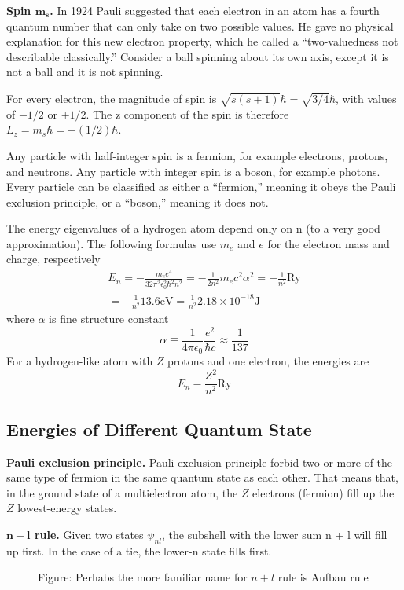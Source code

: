 \documentclass[../../../main.tex]{subfiles}
\begin{document}
\textbf{Spin $\boldsymbol{m_s}$.} In 1924 Pauli suggested that each electron in an atom has a fourth quantum number that can only take on two possible values. He gave no physical explanation for this new electron property, which he called a “two-valuedness not describable classically.” Consider a ball spinning about its own axis, except it is not a ball and it is not spinning.

For every electron, the magnitude of spin is $\sqrt{s(s + 1)}\hbar=\sqrt{3/4}\hbar$, with values of $-1/2$ or $+1/2$. The z component of the spin is therefore $L_z= m_s\hbar=\pm(1/2)\hbar$.

Any particle with half-integer spin is a fermion, for example electrons, protons, and neutrons. Any particle with integer spin is a boson, for example photons. Every particle can be classified as either a “fermion,” meaning it obeys the Pauli exclusion principle, or a “boson,” meaning it does not. 

The energy eigenvalues of a hydrogen atom depend only on n (to a very good approximation). The  following formulas use $m_e$ and $e$ for the electron mass and charge, respectively
\begin{multline*}
    E_n=-\frac{m_ee^4}{32\pi^2\epsilon_0^2
    \hbar^2n^2}=-\frac{1}{2n^2}m_ec^2\alpha^2 = -\frac{1}{n^2}\text{Ry}\\
    = -\frac{1}{n^2}13.6 \text{eV}=\frac{1}{n^2}2.18\times 10^{-18}\text{J}
\end{multline*}
where $\alpha$ is fine structure constant
\begin{equation*}
    \alpha \equiv \frac{1}{4\pi\epsilon_0}\frac{e^2}{\hbar c}\approx \frac{1}{137}
\end{equation*}
For a hydrogen-like atom with $Z$ protons and one electron, the energies are
\begin{equation*}
    E_n-\frac{Z^2}{n^2}\text{Ry}
\end{equation*}

\subsection{Energies of Different Quantum State}
\textbf{Pauli exclusion principle.} Pauli exclusion principle forbid two or more of the same type of fermion in the same quantum state as each other. That means that, in the ground state of a multielectron atom, the $Z$ electrons (fermion) fill up the $Z$ lowest-energy states.

\textbf{$\boldsymbol{n + l}$ rule.} Given two states $\psi_{nl}$, the subshell with the lower sum n + l will fill up first. In the case of a tie, the lower-n state fills first.
\begin{figure}
    \centering
    \caption*{Figure: Perhabs the more familiar name for $n+l$ rule is Aufbau rule}
\end{figure}
\end{document}
